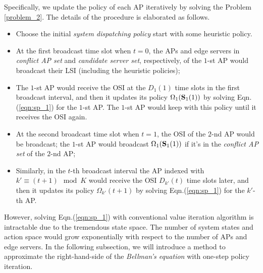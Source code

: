 Specifically, we update the policy of each AP iteratively by solving the Problem \ref{problem_2}.
The details of the procedure is elaborated as follows.
\begin{itemize}
    \item Choose the initial \emph{system dispatching policy} start with some heuristic policy.
    \item At the first broadcast time slot when $t=0$, the APs and edge servers in \emph{conflict AP set} and \emph{candidate server set}, respectively, of the $1$-st AP would broadcast their LSI (including the heuristic policies);
    \item The $1$-st AP would receive the OSI at the $D_1(1)$ time slots in the first broadcast interval, and then it updates its policy $\Omega_{1}(\mathbf{S}_{1}(1))$ by solving Eqn.(\ref{eqn:sp_1}) for the $1$-st AP.
    The $1$-st AP would keep with this policy until it receives the OSI again.
    \item At the second broadcast time slot when $t=1$, the OSI of the $2$-nd AP would be broadcast;
    the $1$-st AP would broadcast $\Omega_{1}(\mathbf{S}_{1}(1))$ if it's in the \emph{conflict AP set} of the $2$-nd AP;
    \item Similarly, in the $t$-th broadcast interval the AP indexed with $k' \equiv (t + 1)\mod{K}$ would receive the OSI $D_{k'}(t)$ time slots later, and then it updates its policy $\Omega_{k'}(t+1)$ by solving Eqn.(\ref{eqn:sp_1}) for the $k'$-th AP.
\end{itemize}

However, solving Eqn.(\ref{eqn:sp_1}) with conventional value iteration algorithm is intractable due to the tremendous state space.
The number of system states and action space would grow exponentially with respect to the number of APs and edge servers.
In the following subsection, we will introduce a method to approximate the right-hand-side of the \emph{Bellman's equation} with one-step policy iteration.

